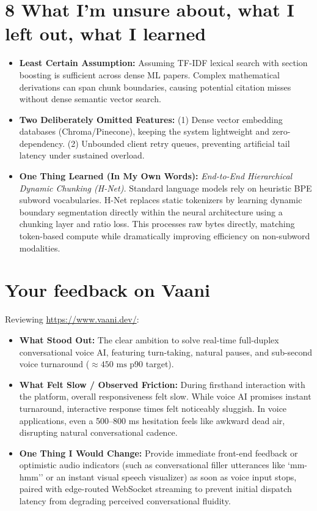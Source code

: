 \documentclass[8.5pt,a4paper]{article}
\begin{document}
\section*{8 What I'm unsure about, what I left out, what I learned}
\begin{itemize}
    \item \textbf{Least Certain Assumption:} Assuming TF-IDF lexical search with section boosting is sufficient across dense ML papers. Complex mathematical derivations can span chunk boundaries, causing potential citation misses without dense semantic vector search.
    \item \textbf{Two Deliberately Omitted Features:} (1) Dense vector embedding databases (Chroma/Pinecone), keeping the system lightweight and zero-dependency. (2) Unbounded client retry queues, preventing artificial tail latency under sustained overload.
    \item \textbf{One Thing Learned (In My Own Words):} \textit{End-to-End Hierarchical Dynamic Chunking (H-Net).} Standard language models rely on heuristic BPE subword vocabularies. H-Net replaces static tokenizers by learning dynamic boundary segmentation directly within the neural architecture using a chunking layer and ratio loss. This processes raw bytes directly, matching token-based compute while dramatically improving efficiency on non-subword modalities.
\end{itemize}

\section*{Your feedback on Vaani}
Reviewing \url{https://www.vaani.dev/}:
\begin{itemize}
    \item \textbf{What Stood Out:} The clear ambition to solve real-time full-duplex conversational voice AI, featuring turn-taking, natural pauses, and sub-second voice turnaround ($\approx 450\text{ ms}$ p90 target).
    \item \textbf{What Felt Slow / Observed Friction:} During firsthand interaction with the platform, overall responsiveness felt slow. While voice AI promises instant turnaround, interactive response times felt noticeably sluggish. In voice applications, even a 500--800 ms hesitation feels like awkward dead air, disrupting natural conversational cadence.
    \item \textbf{One Thing I Would Change:} Provide immediate front-end feedback or optimistic audio indicators (such as conversational filler utterances like `mm-hmm'' or an instant visual speech visualizer) as soon as voice input stops, paired with edge-routed WebSocket streaming to prevent initial dispatch latency from degrading perceived conversational fluidity.
\end{itemize}
\end{document}
